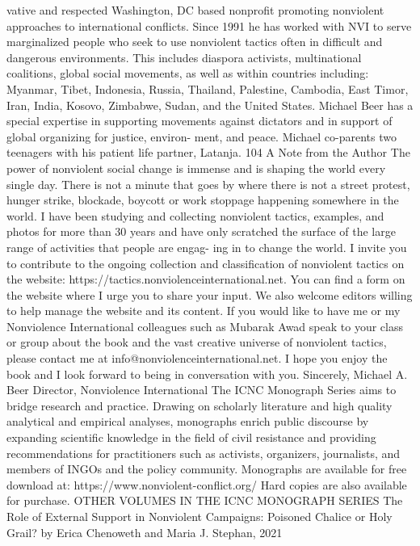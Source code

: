 \documentclass[twoside,a4paper,12pt,fleqn,openany]{extbook}
\begin{document}
vative and respected Washington, DC based nonprofit promoting nonviolent
approaches to international conflicts. Since 1991 he has worked with NVI to
serve marginalized people who seek to use nonviolent tactics often in difficult
and dangerous environments. This includes diaspora activists, multinational
coalitions, global social movements, as well as within countries including:
Myanmar, Tibet, Indonesia, Russia, Thailand, Palestine, Cambodia, East Timor,
Iran, India, Kosovo, Zimbabwe, Sudan, and the United States. Michael Beer has a special expertise
in supporting movements against dictators and in support of global organizing for justice, environ-
ment, and peace. Michael co-parents two teenagers with his patient life partner, Latanja.
104
A Note from the Author
The power of nonviolent social change is immense and is shaping the world every single
day. There is not a minute that goes by where there is not a street protest, hunger strike,
blockade, boycott or work stoppage happening somewhere in the world. I have been
studying and collecting nonviolent tactics, examples, and photos for more than 30 years
and have only scratched the surface of the large range of activities that people are engag-
ing in to change the world.
I invite you to contribute to the ongoing collection and classification of nonviolent tactics
on the website: https://tactics.nonviolenceinternational.net. You can find a form on the
website where I urge you to share your input. We also welcome editors willing to help
manage the website and its content.
If you would like to have me or my Nonviolence International colleagues such as Mubarak
Awad speak to your class or group about the book and the vast creative universe of
nonviolent tactics, please contact me at info@nonviolenceinternational.net.
I hope you enjoy the book and I look forward to being in conversation with you.
Sincerely,
Michael A. Beer
Director, Nonviolence International
The ICNC Monograph Series aims to bridge research and practice. Drawing on
scholarly literature and high quality analytical and empirical analyses, monographs
enrich public discourse by expanding scientific knowledge in the field of civil
resistance and providing recommendations for practitioners such as activists,
organizers, journalists, and members of INGOs and the policy community.
Monographs are available for free download at:
https://www.nonviolent-conflict.org/
Hard copies are also available for purchase.
OTHER VOLUMES IN THE ICNC MONOGRAPH SERIES
The Role of External Support in Nonviolent Campaigns:
Poisoned Chalice or Holy Grail?
by Erica Chenoweth and Maria J. Stephan, 2021
\end{document}
